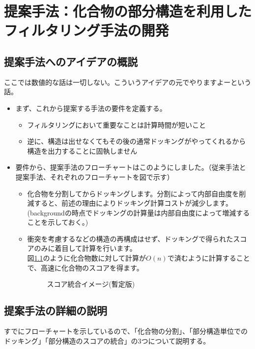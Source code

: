 \chapter{提案手法：化合物の部分構造を利用したフィルタリング手法の開発}

\section{提案手法へのアイデアの概説}
ここでは数値的な話は一切しない。こういうアイデアの元でやりますよーという話。
\begin{itemize}
\item まず、これから提案する手法の要件を定義する。
	\begin{itemize}
	\item フィルタリングにおいて重要なことは計算時間が短いこと
	\item 逆に、構造は出せなくてもその後の通常ドッキングがやってくれるから構造を出力することに固執しません
	\end{itemize}
\item 要件から、提案手法のフローチャートはこのようにしました。（従来手法と提案手法、それぞれのフローチャートを図で示す）
	\begin{itemize}
	\item 化合物を分割してからドッキングします。分割によって内部自由度を削減すると、前述の理由によりドッキング計算コストが減少します。\\
		(backgroundの時点でドッキングの計算量は内部自由度によって増減することを示しておく。)
	\item 衝突を考慮するなどの構造の再構成はせず、ドッキングで得られたスコアのみに着目して計算を行います。\\
		図\ref{fig:integration_image}のように化合物数に対して計算が$O(n)$で済むように計算することで、高速に化合物のスコアを得ます。
		\begin{figure}[htb]
		 \begin{center}
		  \caption{スコア統合イメージ(暫定版)}
		  \label{fig:integration_image}
		 \end{center}
		\end{figure}
	\end{itemize}
\end{itemize}

\section{提案手法の詳細の説明}
すでにフローチャートを示しているので、「化合物の分割」、「部分構造単位でのドッキング」「部分構造のスコアの統合」の3つについて説明する。

